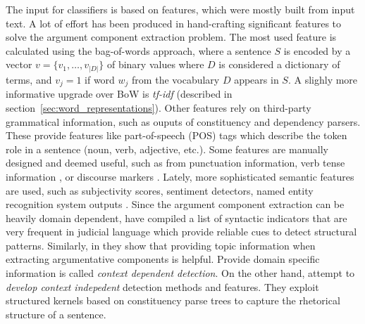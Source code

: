 The input for classifiers is based on features, which were mostly built from input text.
A lot of effort has been produced in hand-crafting significant features to 
solve the argument component extraction problem. 
The most used feature is calculated using the bag-of-words approach, where a
sentence $S$ is encoded by a vector $v = \{v_1, \dots, v_{|D|}\}$ of binary
values where $D$ is considered a dictionary of terms, and $v_j = 1$ if word
$w_j$ from the vocabulary $D$ appears in $S$. A slighly more informative 
upgrade over BoW is \emph{tf-idf} (described in section~\ref{sec:word_representations}).
Other features rely on third-party grammatical information, such as 
ouputs of constituency and dependency parsers. These provide features like
part-of-speech (POS) tags \citep{manning2011part} which describe the token role
in a sentence (noun, verb, adjective, etc.). Some features are manually
designed and deemed useful, such as 
from punctuation information, verb tense information 
\citep{palau2009argumentation, stab2014identifying}, or
discourse markers \citep{eckle2015role}.
Lately, more sophisticated semantic features are used, such as subjectivity scores,
sentiment detectors, named entity recognition system outputs \citep{levy2014context}.
Since the argument component extraction can be heavily domain dependent, 
\citep{palau2009argumentation} have compiled a list of syntactic indicators that 
are very frequent in judicial language which provide reliable cues to 
detect structural patterns. Similarly, in \citep{levy2014context, rinott2015show}
they show that providing topic information when extracting argumentative components
is helpful. Provide domain specific information is called 
\emph{context dependent detection}. On the other hand, 
\citep{lippi2015context} attempt to \emph{develop context indepedent} 
detection methods and features. They exploit structured kernels 
based on constituency parse trees to capture the rhetorical structure
of a sentence. 

